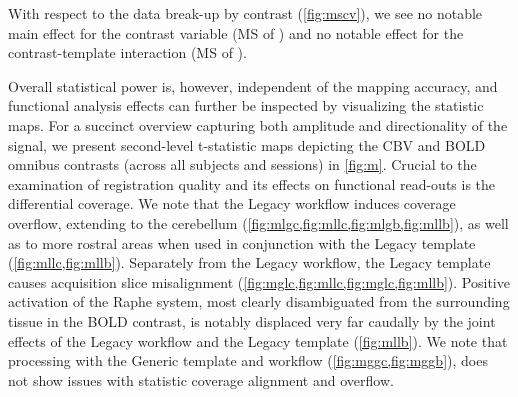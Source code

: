 With respect to the data break-up by contrast (\cref{fig:mscv}), we see no notable main effect for the contrast variable
(MS of )
and no notable effect for the contrast-template interaction
(MS of ).

Overall statistical power is, however, independent of the mapping accuracy, and functional analysis effects can further be inspected by visualizing the statistic maps.
For a succinct overview capturing both amplitude and directionality of the signal, we present second-level t-statistic maps depicting the CBV and BOLD omnibus contrasts (across all subjects and sessions) in \cref{fig:m}.
Crucial to the examination of registration quality and its effects on functional read-outs is the differential coverage.
We note that the Legacy workflow induces coverage overflow, extending to the cerebellum (\cref{fig:mlgc,fig:mllc,fig:mlgb,fig:mllb}), as well as to more rostral areas when used in conjunction with the Legacy template (\cref{fig:mllc,fig:mllb}).
Separately from the Legacy workflow, the Legacy template causes acquisition slice misalignment (\cref{fig:mglc,fig:mllc,fig:mglc,fig:mllb}).
Positive activation of the Raphe system, most clearly disambiguated from the surrounding tissue in the BOLD contrast, is notably displaced very far caudally by the joint effects of the Legacy workflow and the Legacy template (\cref{fig:mllb}).
We note that processing with the Generic template and workflow (\cref{fig:mggc,fig:mggb}), does not show issues with statistic coverage alignment and overflow.

